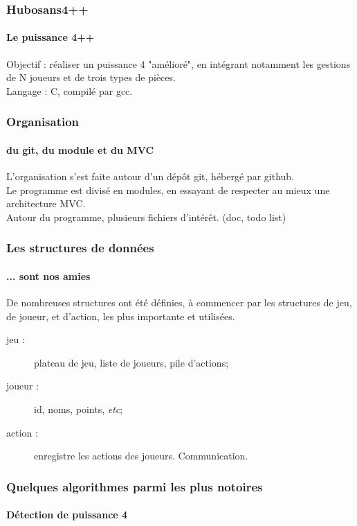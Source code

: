 \documentclass{beamer}
\begin{document}
    \begin{frame}
    \frametitle{Hubosans4++}
    \framesubtitle{Le puissance 4++}
        Objectif : réaliser un puissance 4 "amélioré", 
            en intégrant notamment les gestions de N joueurs 
            et de trois types de pièces. \\     
        Langage : C, compilé par gcc. \\
    \end{frame}


    \begin{frame}
    \frametitle{Organisation}
    \framesubtitle{du git, du module et du MVC}
        L'organisation s'est faite autour d'un dépôt git, 
            hébergé par github. \\ 
        Le programme est divisé en modules, en essayant 
            de respecter au mieux une architecture MVC. \\
        Autour du programme, plusieurs fichiers d'intérêt.
            (doc, todo list)
    \end{frame}


    \begin{frame}
    \frametitle{Les structures de données}
    \framesubtitle{... sont nos amies}
        De nombreuses structures ont été définies, à commencer 
            par les structures de jeu, de joueur, et d'action, 
            les plus importante et utilisées.\\
        \begin{description}
            \item[jeu :] plateau de jeu, liste de joueurs, pile d'actions;\\
            \item[joueur :] id, noms, points, \textit{etc};\\
            \item[action :] enregistre les actions des joueurs. Communication.\\
        \end{description}
    \end{frame}


    \begin{frame}
    \frametitle{Quelques algorithmes parmi les plus notoires}
    \framesubtitle{Détection de puissance 4}
    \end{frame}
\end{document}
